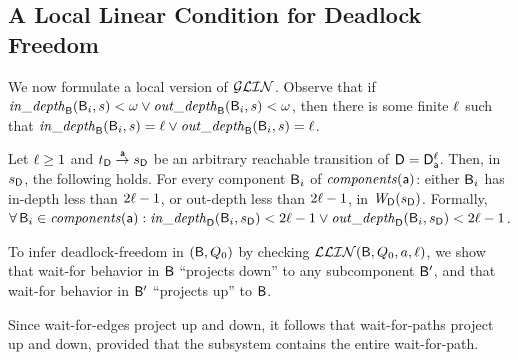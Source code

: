    \subsection{A Local Linear Condition for Deadlock Freedom}
   \label{s:condition}
%   

We now formulate a local version of $\GLin$.
Observe that if
$\widepth{\B}{\B_i}{s} < \omega \lor \wodepth{\B}{\B_i}{s} < \omega$,
then there is some finite $\l$ such that 
$\widepth{\B}{\B_i}{s} = \l \lor \wodepth{\B}{\B_i}{s} = \l$.




\begin{definition} \label{def:ldfc-k}
\label{def:locLinear}
Let $\l \ge 1$ and $\tD \goesto[\act] \sD$ be an arbitrary reachable transition of $\DS = \dsks{\act}{\l}$.
Then, in $\sD$, the following holds. 
For every component $\B_i$ of $\cmps{\act}$:  
either $\B_i$ has in-depth less than $2\l - 1$, or out-depth less than $2\l - 1$, in $\wfg{\dsk{\act}{\l}}{\sD}$. 
Formally,\\
\ind  $\fa \B_i \in \cmps{\act}: 
\widepth{\dsk{\act}{\l}}{\B_i}{\sD} < 2\l-1 \lor \wodepth{\dsk{\act}{\l}}{\B_i}{\sD} < 2\l-1$.
\end{definition}


To infer deadlock-freedom in $(\B, Q_0)$ by checking $\LLin(\B, Q_0, a, \l)$,
 we show that wait-for behavior in $\B$ ``projects down''
to any subcomponent $\B'$, and that wait-for behavior in $\B'$ ``projects up'' to $\B$.

Since wait-for-edges project up and down, it follows that wait-for-paths
project up and down, provided that the subsystem contains the entire wait-for-path.

